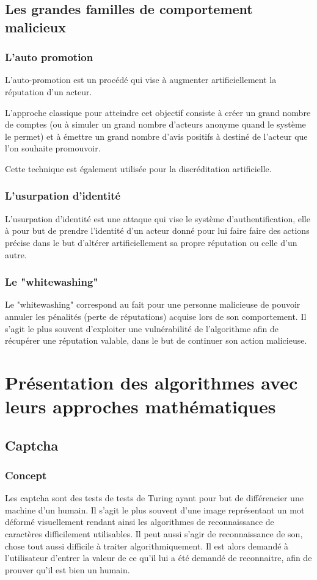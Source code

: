 \documentclass[a4paper, 11pt]{article} %
\begin{document}
\subsection{Les grandes familles de comportement malicieux}
\subsubsection{L'auto promotion}
L'auto-promotion est un procédé qui vise à augmenter artificiellement la réputation
d'un acteur.

L'approche classique pour atteindre cet objectif consiste à créer un grand nombre
de comptes (ou à simuler un grand nombre d'acteurs anonyme quand le système le permet)
et à émettre un grand nombre d'avis positifs à destiné de l'acteur que l'on souhaite
promouvoir.

Cette technique est également utilisée pour la discréditation artificielle.

\subsubsection{L'usurpation d'identité}
L'usurpation d'identité est une attaque qui vise le système d'authentification,
elle à pour but de prendre l'identité d'un acteur donné pour lui faire faire des
actions précise dans le but d'altérer artificiellement sa propre réputation ou celle
d'un autre.

\subsubsection{Le "whitewashing"}
Le "whitewashing" correspond au fait pour une personne malicieuse de pouvoir annuler les pénalités (perte de réputations) acquise lors de son comportement.
Il s'agit le plus souvent d'exploiter une vulnérabilité de l'algorithme afin de récupérer une réputation valable, dans le but de continuer son action malicieuse.

\section{Présentation des algorithmes avec leurs approches mathématiques}
\subsection{Captcha}
\subsubsection{Concept}
Les captcha sont des tests de tests de Turing ayant pour but de différencier une machine d'un humain.
Il s'agit le plus souvent d'une image représentant un mot déformé visuellement rendant ainsi les algorithmes de reconnaissance de caractères difficilement utilisables.
Il peut aussi s'agir de reconnaissance de son, chose tout aussi difficile à traiter algorithmiquement.
Il est alors demandé à l'utilisateur d'entrer la valeur de ce qu'il lui a été demandé de reconnaitre, afin de prouver qu'il est bien un humain.
\end{document}

